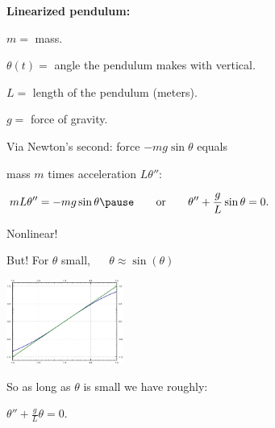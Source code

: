 \documentclass[10pt,aspectratio=169]{beamer}
\begin{document}
\begin{frame}
\textbf{Linearized pendulum:}

\vspace*{-12pt}
\hspace*{3.2in}%

\vspace*{-1.4in}

$m = {}$ mass.

$\theta(t) = {}$ angle the pendulum makes with vertical.

$L = {}$ length of the pendulum (meters).

$g = {}$ force of gravity.

\medskip
\pause

Via Newton's second: force $-mg \sin \theta$ equals

mass $m$ times acceleration
$L \theta''$:

\medskip

\qquad
$
\displaystyle
mL\theta'' = -mg \sin \theta
\pause
\qquad
\text{or}
\qquad
\theta'' + \frac{g}{L} \sin \theta = 0 .
$

\pause

Nonlinear!

\medskip
\pause

But!  For $\theta$ small, ~~ $\theta \approx \sin(\theta)$

\vspace*{-12pt}%
\hspace*{3.2in}%
\includegraphics[width=1.5in]{../figures/mv-sintheta.pdf}

\vspace*{-0.8in}
\pause

So as long as $\theta$ is small we have roughly:

\medskip

\qquad
$
\displaystyle
\theta'' + \frac{g}{L} \theta = 0 .
$

\vspace*{12pt}

\end{frame}
\end{document}
